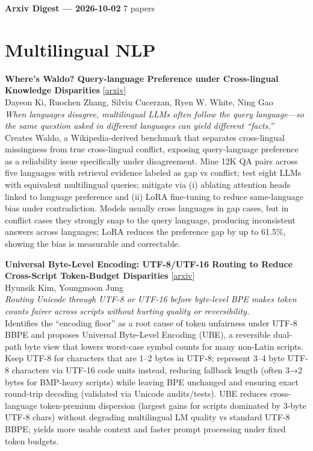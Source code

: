 \documentclass[12pt,letterpaper]{article}
\begin{document}
{\footnotesize\textbf{Arxiv Digest --- 2026-10-02} \hfill 7 papers}

\smallskip

\section*{Multilingual NLP}

{\small\textbf{Where's Waldo? Query-language Preference under Cross-lingual Knowledge Disparities}} {\scriptsize[\href{https://arxiv.org/abs/2610.00606}{arxiv}]}\\
{\scriptsize Dayeon Ki, Ruochen Zhang, Silviu Cucerzan, Ryen W. White, Ning Gao}\\

{\small\textit{When languages disagree, multilingual LLMs often follow the query language---so the same question asked in different languages can yield different ``facts.''}}\\[1pt]
{\footnotesize Creates Waldo, a Wikipedia-derived benchmark that separates cross-lingual missingness from true cross-lingual conflict, exposing query-language preference as a reliability issue specifically under disagreement. Mine 12K QA pairs across five languages with retrieval evidence labeled as gap vs conflict; test eight LLMs with equivalent multilingual queries; mitigate via (i) ablating attention heads linked to language preference and (ii) LoRA fine-tuning to reduce same-language bias under contradiction. Models usually cross languages in gap cases, but in conflict cases they strongly snap to the query language, producing inconsistent answers across languages; LoRA reduces the preference gap by up to 61.5\%, showing the bias is measurable and correctable.}

\medskip

{\small\textbf{Universal Byte-Level Encoding: UTF-8/UTF-16 Routing to Reduce Cross-Script Token-Budget Disparities}} {\scriptsize[\href{https://arxiv.org/abs/2610.01984}{arxiv}]}\\
{\scriptsize Hyunsik Kim, Youngmoon Jung}\\

{\small\textit{Routing Unicode through UTF-8 or UTF-16 before byte-level BPE makes token counts fairer across scripts without hurting quality or reversibility.}}\\[1pt]
{\footnotesize Identifies the ``encoding floor'' as a root cause of token unfairness under UTF-8 BBPE and proposes Universal Byte-Level Encoding (UBE), a reversible dual-path byte view that lowers worst-case symbol counts for many non-Latin scripts. Keep UTF-8 for characters that are 1--2 bytes in UTF-8; represent 3--4 byte UTF-8 characters via UTF-16 code units instead, reducing fallback length (often 3→2 bytes for BMP-heavy scripts) while leaving BPE unchanged and ensuring exact round-trip decoding (validated via Unicode audits/tests). UBE reduces cross-language token-premium dispersion (largest gains for scripts dominated by 3-byte UTF-8 chars) without degrading multilingual LM quality vs standard UTF-8 BBPE; yields more usable context and faster prompt processing under fixed token budgets.}
\end{document}
